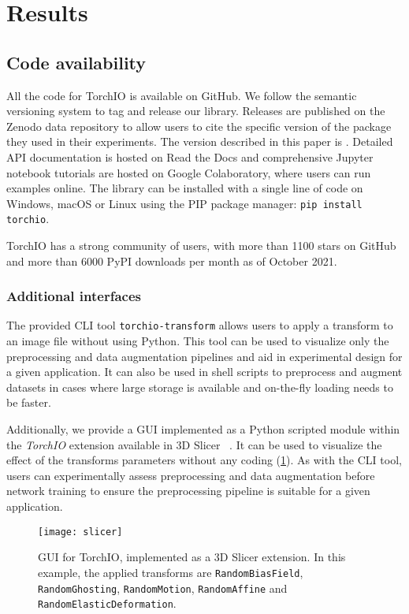 \section{Results}

\subsection{Code availability}

All the code for TorchIO is available on GitHub.
We follow the semantic versioning system \cite{preston-werner_semantic_2020} to tag and release our library.
Releases are published on the Zenodo data repository to allow users to cite the specific version of the package they used in their experiments.
The version described in this paper is \torchioversion \cite{perez-garcia_fepegartorchio_2020}.
Detailed \ac{API} documentation is hosted on Read the Docs and comprehensive Jupyter notebook tutorials are hosted on Google Colaboratory, where users can run examples online.
The library can be installed with a single line of code on Windows, macOS or Linux using the \ac{PIP} package manager: \texttt{pip install torchio}.

TorchIO has a strong community of users, with more than 1100 stars on GitHub and more than 6000 \ac{PyPI} downloads per month as of October 2021.


\subsubsection{Additional interfaces}

The provided \ac{CLI} tool \texttt{torchio-transform} allows users to apply a transform to an image file without using Python.
This tool can be used to visualize only the preprocessing and data augmentation pipelines and aid in experimental design for a given application.
It can also be used in shell scripts to preprocess and augment datasets in cases where large storage is available and on-the-fly loading needs to be faster.

Additionally, we provide a \ac{GUI} implemented as a Python scripted module within the \textit{TorchIO} extension available in 3D Slicer~\cite{fedorov_3d_2012}%
.
It can be used to visualize the effect of the transforms parameters without any coding (\cref{fig:slicer}).
As with the \ac{CLI} tool, users can experimentally assess preprocessing and data augmentation before network training to ensure the preprocessing pipeline is suitable for a given application.

\begin{figure}
  \centering
  \texttt{[image: slicer]}
  \caption{%
    \Ac{GUI} for TorchIO,
    implemented as a 3D Slicer extension.
    In this example, the applied transforms are
    \texttt{RandomBiasField},
    \texttt{RandomGhosting},
    \texttt{RandomMotion},
    \texttt{RandomAffine} and
    \texttt{RandomElasticDeformation}.
  }
  \label{fig:slicer}
\end{figure}
